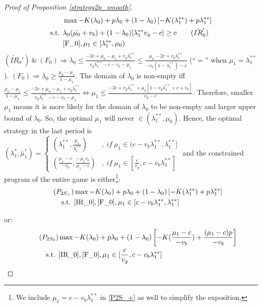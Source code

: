 \documentclass[11pt]{extarticle}
\newcommand{\lra}{\Leftrightarrow}
\newcommand{\ra}{\Rightarrow}
\begin{document}
\begin{proof}[Proof of Proposition \ref{strategy2p_smooth}]
	\vspace{-20pt}
	\begin{align}
	& \max -K(\lambda_0) + p \lambda_0 + (1-\lambda_0) \left[-K(\lambda_1^{**})+p \lambda_1^{**}\right] \nonumber\\
	\text{s.t. } &\lambda_0(\bar{\mu_0}+v_b) + (1-\lambda_0)[\lambda_1^{**}v_g-c]\geq c \tag{$\tilde{IR}_0'$}\\
	&\eqref{F_0}, \mu_1\in [\lambda_1^{**}, \mu_0) \nonumber
	\end{align}
	$(\tilde{IR}_0')~\&~(F_0) \ra \lambda_0 \leq \frac{-2c+\mu_0-\mu_1+ v_g\lambda_1^{**}}{v_g\lambda_1^{**}-c-v_b-\mu_1} \leq \frac{\mu_0-2c+v_b \lambda_1^{**}}{-v_b(1-\lambda_1^{**})-c}$ (``$=$'' when $\mu_1 = \lambda_1^{**}$). $(F_0) \ra \lambda_0 \geq \frac{\mu_0-\mu_1}{1-\mu_1}$. The domain of $\lambda_0$ is non-empty iff $\frac{\mu_0-\mu_1}{1-\mu_1}\leq \frac{-2c+\mu_0-\mu_1+ v_g\lambda_1^{**}}{v_g\lambda_1^{**}-c-v_b-\mu_1} \lra \mu_1 \leq \frac{-2c+v_g\lambda_1^{**}+\mu_0[1-v_g\lambda_1^{**}+c+v_b]}{v_g-c}$. Therefore, smaller $\mu_1$ means it is more likely for the domain of $\lambda_0$ to be non-empty and larger upper bound of $\lambda_0$. So, the optimal $\mu_1$ will never $\in (\lambda_1^{**},\mu_0)$. Hence, the optimal strategy in the last period is $(\lambda_1^*,\bar{\mu}_1^*)=
	\begin{cases}
	(\lambda_1^{**},\frac{\mu_1}{\lambda_1^{**}})& ,~if~ \mu_1 \in (c - v_b \lambda_1^{**}, \lambda_1^{**}]\\
	(\frac{\mu_1-c}{-v_b},\frac{-\mu_1 v_b}{\mu_1-c})& ,~if~ \mu_1 \in [\frac{c}{v_g}, c - v_b \lambda_1^{**}]
	\end{cases}$ and the constrained program of the entire game is either\footnote{We include $\mu_1 = c - v_b \lambda_1^{**}$ in \eqref{P2S_+} as well to simplify the exposition.}:
	\begin{align}\tag{$P_{2S_+}$} \label{P2S_+}
	& \max -K(\lambda_0) + p \lambda_0 + (1-\lambda_0) \left[-K(\lambda_1^{**})+p \lambda_1^{**}\right] \nonumber\\
	\text{s.t. } &\eqref{IR_0},\eqref{F_0}, \mu_1\in [c - v_b \lambda_1^{**}, \lambda_1^{**}] \nonumber
	\end{align}
	
	or:
	\vspace{-33pt}
	\begin{align}\tag{$P_{2S_0}$} \label{P2S_0}
	& \max -K(\lambda_0) + p \lambda_0 + (1-\lambda_0) \left[-K(\frac{\mu_1-c}{-v_b})+\frac{(\mu_1-c)p}{-v_b}\right] \nonumber\\
	\text{s.t. } &\eqref{IR_0},\eqref{F_0}, \mu_1 \in [\frac{c}{v_g}, c - v_b \lambda_1^{**}]\nonumber
	\end{align}


\end{proof}
\end{document}
